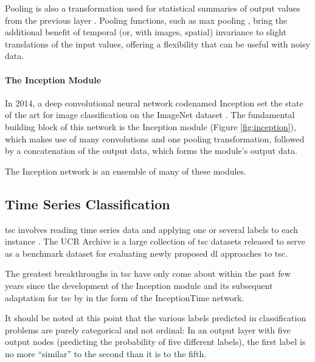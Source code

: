 Pooling is also a transformation used for statistical summaries of output values from the previous layer \cite[]{goodfellow_deep_2016}. Pooling functions, such as max pooling \cite[]{zhou_computation_1988}, bring the additional benefit of temporal (or, with images, spatial) invariance to slight translations of the input values, offering a flexibility that can be useful with noisy data.

\paragraph*{The Inception Module} \label{sec:theory:inception}
In 2014, a deep convolutional neural network codenamed Inception \cite[]{szegedy_going_2014} set the state of the art for image classification on the ImageNet dataset \cite[]{russakovsky_imagenet_2015}. The fundamental building block of this network is the Inception module (Figure \ref{fig:inception}), which makes use of many convolutions and one pooling transformation, followed by a concatenation of the output data, which forms the module's output data.



The Inception network is an ensemble of many of these modules.

\subsection{Time Series Classification}\label{sec:tsc}
\ac{tsc} involves reading time series data and applying one or several labels to each instance \cite{fawaz_inceptiontime_2019}. The UCR Archive \cite{dau_ucr_2019} is a large collection of \ac{tsc} datasets released to serve as a benchmark dataset for evaluating newly proposed \ac{dl} approaches to \ac{tsc}.

The greatest breakthroughs in \ac{tsc} have only come about within the past few years since the development of the Inception module and its subsequent adaptation for \ac{tsc} by \citet[]{fawaz_inceptiontime_2019} in the form of the InceptionTime network.

It should be noted at this point that the various labels predicted in classification problems are purely categorical and not ordinal: In an output layer with five output nodes (predicting the probability of five different labels), the first label is no more ``similar'' to the second than it is to the fifth.


